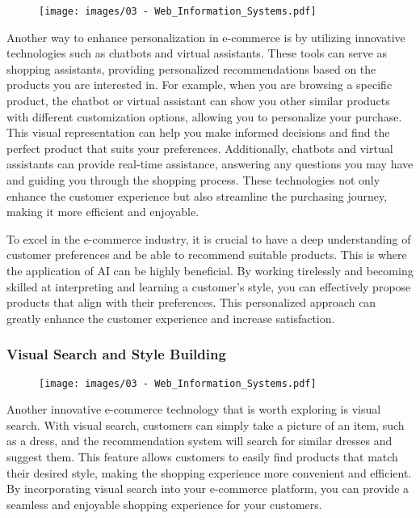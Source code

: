 \begin{figure}[!h]
  \centering
  \texttt{[image: images/03 - Web\_Information\_Systems.pdf]}
\end{figure}

Another way to enhance personalization in e-commerce is by utilizing
innovative technologies such as chatbots and virtual assistants. These
tools can serve as shopping assistants, providing personalized
recommendations based on the products you are interested in. For
example, when you are browsing a specific product, the chatbot or
virtual assistant can show you other similar products with different
customization options, allowing you to personalize your purchase. This
visual representation can help you make informed decisions and find the
perfect product that suits your preferences. Additionally, chatbots and
virtual assistants can provide real-time assistance, answering any
questions you may have and guiding you through the shopping process.
These technologies not only enhance the customer experience but also
streamline the purchasing journey, making it more efficient and
enjoyable.

To excel in the e-commerce industry, it is crucial to have a deep
understanding of customer preferences and be able to recommend suitable
products. This is where the application of AI can be highly
beneficial. By working tirelessly and becoming skilled at interpreting
and learning a customer's style, you can effectively propose products
that align with their preferences. This personalized approach can
greatly enhance the customer experience and increase satisfaction.

\subsubsection{Visual Search and Style
  Building}\label{visual-search-and-style-building}

\begin{figure}[!h]
  \centering
  \texttt{[image: images/03 - Web\_Information\_Systems.pdf]}
\end{figure}

Another innovative e-commerce technology that is worth exploring is
visual search. With visual search, customers can simply take a picture
of an item, such as a dress, and the recommendation system will search
for similar dresses and suggest them. This feature allows customers to
easily find products that match their desired style, making the shopping
experience more convenient and efficient. By incorporating visual search
into your e-commerce platform, you can provide a seamless and enjoyable
shopping experience for your customers.

